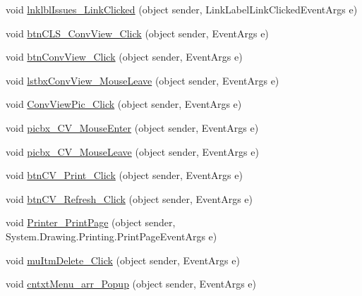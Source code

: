 \begin{DoxyCompactItemize}
\item 
void \hyperlink{class_sr_p___classroom_inq_1_1frm_classrrom_inq_ab250baad97d73c003a671693f24aaf0a}{lnklbl\-Issues\-\_\-\-Link\-Clicked} (object sender, \-Link\-Label\-Link\-Clicked\-Event\-Args e)
\item 
void \hyperlink{class_sr_p___classroom_inq_1_1frm_classrrom_inq_ac16e7e664d136fcd9a2322bdae21b8b4}{btn\-C\-L\-S\-\_\-\-Conv\-View\-\_\-\-Click} (object sender, \-Event\-Args e)
\item 
void \hyperlink{class_sr_p___classroom_inq_1_1frm_classrrom_inq_aba872e01b5d503de6b2311405850549c}{btn\-Conv\-View\-\_\-\-Click} (object sender, \-Event\-Args e)
\item 
void \hyperlink{class_sr_p___classroom_inq_1_1frm_classrrom_inq_a89e7441c50059838d9acbea2073c70c9}{lstbx\-Conv\-View\-\_\-\-Mouse\-Leave} (object sender, \-Event\-Args e)
\item 
void \hyperlink{class_sr_p___classroom_inq_1_1frm_classrrom_inq_a47059fedf8a6d360fecf6723d0800aba}{\-Conv\-View\-Pic\-\_\-\-Click} (object sender, \-Event\-Args e)
\item 
void \hyperlink{class_sr_p___classroom_inq_1_1frm_classrrom_inq_aa87dbf334dcda09f2f4f447f1aeead56}{picbx\-\_\-\-C\-V\-\_\-\-Mouse\-Enter} (object sender, \-Event\-Args e)
\item 
void \hyperlink{class_sr_p___classroom_inq_1_1frm_classrrom_inq_a7729ac7ccc616c9623c0aa38929d1ad9}{picbx\-\_\-\-C\-V\-\_\-\-Mouse\-Leave} (object sender, \-Event\-Args e)
\item 
void \hyperlink{class_sr_p___classroom_inq_1_1frm_classrrom_inq_a58d2c5f78600a8bb93743a3eb399a0c0}{btn\-C\-V\-\_\-\-Print\-\_\-\-Click} (object sender, \-Event\-Args e)
\item 
void \hyperlink{class_sr_p___classroom_inq_1_1frm_classrrom_inq_a4ca2a2e4d7fb919dbcedf7634b6b835a}{btn\-C\-V\-\_\-\-Refresh\-\_\-\-Click} (object sender, \-Event\-Args e)
\item 
void \hyperlink{class_sr_p___classroom_inq_1_1frm_classrrom_inq_a79e2df939051406824a37f0daea3e5d4}{\-Printer\-\_\-\-Print\-Page} (object sender, \-System.\-Drawing.\-Printing.\-Print\-Page\-Event\-Args e)
\item 
void \hyperlink{class_sr_p___classroom_inq_1_1frm_classrrom_inq_a39aaad15d2ebcbb4f4e65b7c63db4d67}{mu\-Itm\-Delete\-\_\-\-Click} (object sender, \-Event\-Args e)
\item 
void \hyperlink{class_sr_p___classroom_inq_1_1frm_classrrom_inq_acfeb1a732384a5847d78b3a061704098}{cntxt\-Menu\-\_\-arr\-\_\-\-Popup} (object sender, \-Event\-Args e)

\end{DoxyCompactItemize}
